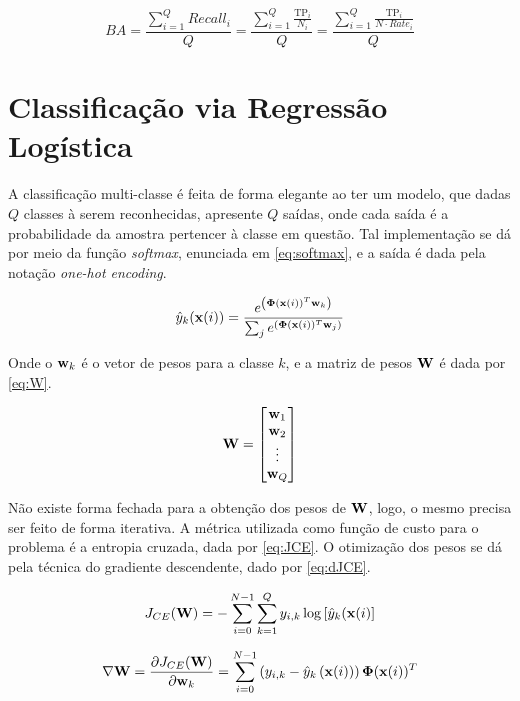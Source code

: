 \begin{equation}\label{eq:ba}
	BA = \frac{\sum_{i=1}^{Q}Recall_i}{Q} = \frac{\sum_{i=1}^{Q}\frac{\text{TP}_i}{N_i}}{Q} = \frac{\sum_{i=1}^{Q}\frac{\text{TP}_i}{N\cdot Rate_i}}{Q}
\end{equation}



\clearpage
\section{Classificação via Regressão Logística}

A classificação multi-classe é feita de forma elegante ao ter um modelo, que dadas $Q$ classes à serem reconhecidas, apresente $Q$ saídas, onde cada saída é a probabilidade da amostra pertencer à classe em questão. Tal implementação se dá por meio da função \textit{softmax}, enunciada em \eqref{eq:softmax}, e a saída é dada pela notação \textit{one-hot encoding}.

\begin{equation}\label{eq:softmax}
	\hat{y}_k (\mathbf{x}(i)) = \frac{e^{\left(\mathbf{\Phi}(\mathbf{x}(i))^T\mathbf{w}_k\right)}}{\sum_{j}e^{\left(\mathbf{\Phi}(\mathbf{x}(i))^T\mathbf{w}_j\right)}}
\end{equation}

Onde o $\mathbf{w}_k$ é o vetor de pesos para a classe $k$, e a matriz de pesos $\mathbf{W}$ é dada por \eqref{eq:W}.

\begin{equation}\label{eq:W}
	\mathbf{W} = \begin{bmatrix}
		\mathbf{w}_1 \\
		\mathbf{w}_2 \\
		\vdots \\
		\mathbf{w}_Q
	\end{bmatrix}
\end{equation}

Não existe forma fechada para a obtenção dos pesos de $\mathbf{W}$, logo, o mesmo precisa ser feito de forma iterativa. A métrica utilizada como função de custo para o problema é a entropia cruzada, dada por \eqref{eq:JCE}. O otimização dos pesos se dá pela técnica do gradiente descendente, dado por \eqref{eq:dJCE}.

\begin{equation}\label{eq:JCE}
	J_{CE}(\mathbf{W}) = -\sum_{i=0}^{N-1}\sum_{k=1}^{Q}y_{i,k}\log\left[\hat{y}_k(\mathbf{x}(i)\right]
\end{equation}

\begin{equation}\label{eq:dJCE}
	\nabla\mathbf{W} = \frac{\partial J_{CE}(\mathbf{W})}{\partial \mathbf{w}_k} = \sum_{i=0}^{N-1} \left(y_{i,k} - \hat{y}_k\left(\mathbf{x}(i)\right)\right)\mathbf{\Phi}(\mathbf{x}(i))^T
\end{equation}

